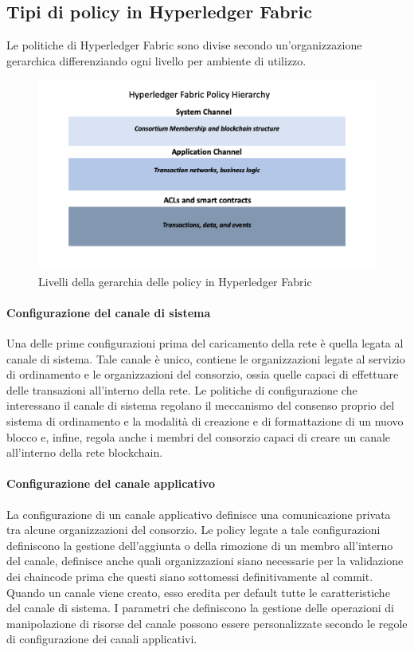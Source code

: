 \subsection{Tipi di policy in Hyperledger Fabric}
Le politiche di Hyperledger Fabric sono divise secondo un'organizzazione gerarchica differenziando ogni livello per ambiente di utilizzo. 
\begin{figure}[h]
    \centering
    \includegraphics[width=1\textwidth]{img/policy-hierarchy.png}
    \caption{Livelli della gerarchia delle policy in Hyperledger Fabric}
    \label{fig:policy-fabric}
\end{figure}
\paragraph{Configurazione del canale di sistema}
Una delle prime configurazioni prima del caricamento della rete è quella legata al canale di sistema. Tale canale è unico, contiene le organizzazioni legate al servizio di ordinamento e le organizzazioni del consorzio, ossia quelle capaci di effettuare delle transazioni all'interno della rete. Le politiche di configurazione che interessano il canale di sistema regolano il meccanismo del consenso proprio del sistema di ordinamento e la modalità di creazione e di formattazione di un nuovo blocco e, infine, regola anche i membri del consorzio capaci di creare un canale all'interno della rete blockchain.
\paragraph{Configurazione del canale applicativo}
La configurazione di un canale applicativo definisce una comunicazione privata tra alcune organizzazioni del consorzio. Le policy legate a tale configurazioni definiscono la gestione dell'aggiunta o della rimozione di un membro all'interno del canale, definisce anche quali organizzazioni siano necessarie per la validazione dei chaincode prima che questi siano sottomessi definitivamente al commit. Quando un canale viene creato, esso eredita per default tutte le caratteristiche del canale di sistema. I parametri che definiscono la gestione delle operazioni di manipolazione di risorse del canale possono essere personalizzate secondo le regole di configurazione dei canali applicativi.
